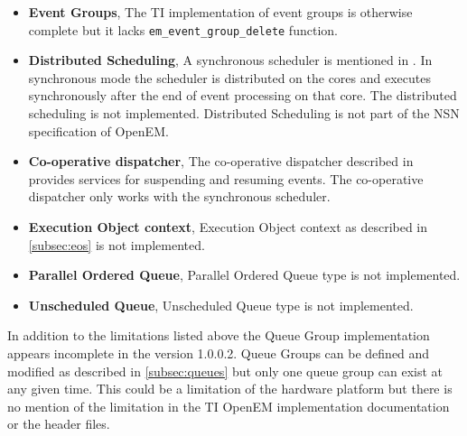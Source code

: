 \begin{itemize}
    \item \textbf{Event Groups},
        The TI implementation of event groups is otherwise complete but it lacks \texttt{em\_event\_group\_delete} function.
    \item \textbf{Distributed Scheduling},
        A synchronous scheduler is mentioned in \cite{openemwhite}. In synchronous mode the scheduler is distributed on the cores and executes synchronously after the end of event processing on that core. The distributed scheduling is not implemented. Distributed Scheduling is not part of the NSN specification of OpenEM.
    \item \textbf{Co-operative dispatcher},
        The co-operative dispatcher described in \cite{openemwhite} provides services for suspending and resuming events. The co-operative dispatcher only works with the synchronous scheduler.
    \item \textbf{Execution Object context},
        Execution Object context as described in \ref{subsec:eos} is not implemented.
    \item \textbf{Parallel Ordered Queue},
        Parallel Ordered Queue type is not implemented.
    \item \textbf{Unscheduled Queue},
        Unscheduled Queue type is not implemented.
\end{itemize}

In addition to the limitations listed above the Queue Group implementation appears incomplete in the version 1.0.0.2. Queue Groups can be defined and modified as described in \ref{subsec:queues} but only one queue group can exist at any given time. This could be a limitation of the hardware platform but there is no mention of the limitation in the TI OpenEM implementation documentation or the header files.
